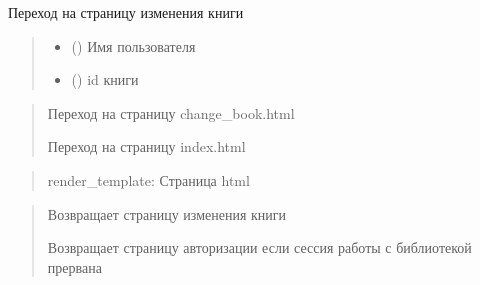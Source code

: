 \documentclass[letterpaper,10pt,russian]{sphinxmanual}
\begin{document}
\begin{fulllineitems}
\label{\detokenize{blueprints:blueprints.change_book_information.change_book}}
\pysigstartsignatures
{}
\pysigstopsignatures
\sphinxAtStartPar
Переход на страницу изменения книги
\begin{quote}\begin{description}
\begin{itemize}
\item {} 
\sphinxAtStartPar
{} () \textendash{} Имя пользователя

\item {} 
\sphinxAtStartPar
{} () \textendash{} id книги

\end{itemize}

\end{description}\end{quote}
\begin{description}
\begin{quote}\begin{description}
\sphinxAtStartPar
Переход на страницу change\_book.html

\sphinxAtStartPar
Переход на страницу index.html

\end{description}\end{quote}

\end{description}
\begin{quote}\begin{description}
\sphinxAtStartPar
render\_template: Страница html

\end{description}\end{quote}
\begin{description}
\begin{quote}\begin{description}
\sphinxAtStartPar
Возвращает страницу изменения книги

\sphinxAtStartPar
Возвращает страницу авторизации если сессия работы с библиотекой прервана

\end{description}\end{quote}

\end{description}

\end{fulllineitems}
\end{document}

